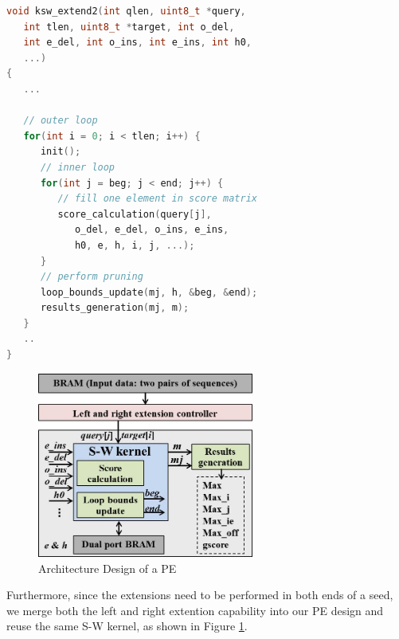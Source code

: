 \begin{lstlisting}[language={c++},basicstyle=\small,
caption={The ksw\_extend2() in BWA-MEM: a high-level view.},
captionpos=b,
label={list:ksw_extend2}]
void ksw_extend2(int qlen, uint8_t *query, 
   int tlen, uint8_t *target, int o_del, 
   int e_del, int o_ins, int e_ins, int h0, 
   ...)
{
   ...

   // outer loop
   for(int i = 0; i < tlen; i++) {
      init();
      // inner loop
      for(int j = beg; j < end; j++) {
         // fill one element in score matrix
         score_calculation(query[j],
            o_del, e_del, o_ins, e_ins, 
            h0, e, h, i, j, ...);
      }
      // perform pruning
      loop_bounds_update(mj, h, &beg, &end);
      results_generation(mj, m);
   }
   ..
}
\end{lstlisting}

\begin{figure}[!hbt]
\begin{center}
\includegraphics[width=2.8in]{Figures/Figure_Arch3.jpg}
\caption {Architecture Design of a PE} \label{fig:pe_archi} \end{center} \end{figure}


Furthermore, since the extensions need to be performed in both ends of a seed,
we merge both the left and right extention capability into our PE design and reuse the same S-W kernel, 
as shown in Figure \ref{fig:pe_archi}.

